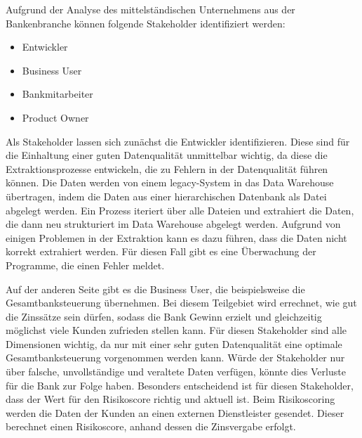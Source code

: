 
Aufgrund der Analyse des mittelständischen Unternehmens aus der Bankenbranche können folgende Stakeholder identifiziert werden:
\begin{itemize}
\item Entwickler            %
\item Business User         %
\item Bankmitarbeiter       %
\item Product Owner         %
\end{itemize}

Als Stakeholder lassen sich zunächst die Entwickler identifizieren.
Diese sind für die Einhaltung einer guten Datenqualität unmittelbar wichtig, da diese die Extraktionsprozesse entwickeln, die zu Fehlern in der Datenqualität führen können.
Die Daten werden von einem legacy-System in das Data Warehouse übertragen, indem die Daten aus einer hierarchischen Datenbank als Datei abgelegt werden.
Ein Prozess iteriert über alle Dateien und extrahiert die Daten, die dann neu strukturiert im Data Warehouse abgelegt werden.
Aufgrund von einigen Problemen in der Extraktion kann es dazu führen, dass die Daten nicht korrekt extrahiert werden.
Für diesen Fall gibt es eine Überwachung der Programme, die einen Fehler meldet.

Auf der anderen Seite gibt es die Business User, die beispielsweise die Gesamtbanksteuerung übernehmen.
Bei diesem Teilgebiet wird errechnet, wie gut die Zinssätze sein dürfen, sodass die Bank Gewinn erzielt und gleichzeitig möglichst viele Kunden zufrieden stellen kann.
Für diesen Stakeholder sind alle Dimensionen wichtig, da nur mit einer sehr guten Datenqualität eine optimale Gesamtbanksteuerung vorgenommen werden kann. 
Würde der Stakeholder nur über falsche, unvollständige und veraltete Daten verfügen, könnte dies Verluste für die Bank zur Folge haben.
Besonders entscheidend ist für diesen Stakeholder, dass der Wert für den Risikoscore richtig und aktuell ist.
Beim Risikoscoring werden die Daten der Kunden an einen externen Dienstleister gesendet.
Dieser berechnet einen Risikoscore, anhand dessen die Zinsvergabe erfolgt.

